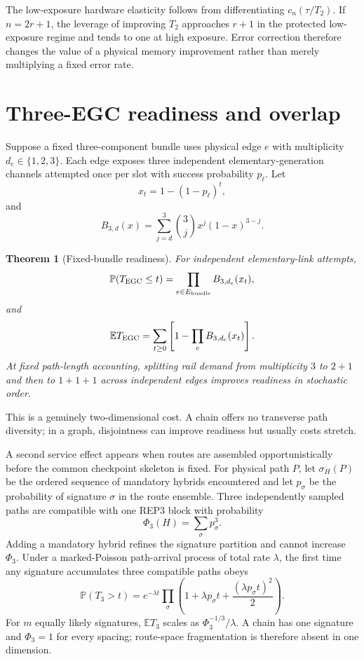 \documentclass[aps,prx,reprint,superscriptaddress,nofootinbib,longbibliography,floatfix]{revtex4-2}
\newtheorem{theorem}{Theorem}\newtheorem{proposition}[theorem]{Proposition}\newtheorem{corollary}[theorem]{Corollary}
\newcommand{\E}{\mathbb E}\newcommand{\Prob}{\mathbb P}
\begin{document}
The low-exposure hardware elasticity follows from differentiating $c_n(\tau/T_2)$. If $n=2r+1$, the leverage of improving $T_2$ approaches $r+1$ in the protected low-exposure regime and tends to one at high exposure. Error correction therefore changes the value of a physical memory improvement rather than merely multiplying a fixed error rate.

\section{Three-EGC readiness and overlap}
Suppose a fixed three-component bundle uses physical edge $e$ with multiplicity $d_e\in\{1,2,3\}$. Each edge exposes three independent elementary-generation channels attempted once per slot with success probability $p_\ell$. Let
\begin{equation}
x_t=1-(1-p_\ell)^t,
\end{equation}
and
\begin{equation}
B_{3,d}(x)=\sum_{j=d}^{3}{3\choose j}x^j(1-x)^{3-j}.
\end{equation}

\begin{theorem}[Fixed-bundle readiness]
For independent elementary-link attempts,
\begin{equation}
\Prob(T_{\rm EGC}\le t)=\prod_{e\in E_{\rm bundle}}B_{3,d_e}(x_t),
\end{equation}
and
\begin{equation}
\E T_{\rm EGC}=\sum_{t\ge0}\left[1-\prod_e B_{3,d_e}(x_t)\right].
\end{equation}
At fixed path-length accounting, splitting rail demand from multiplicity $3$ to $2+1$ and then to $1+1+1$ across independent edges improves readiness in stochastic order.
\end{theorem}

This is a genuinely two-dimensional cost. A chain offers no transverse path diversity; in a graph, disjointness can improve readiness but usually costs stretch.

A second service effect appears when routes are assembled opportunistically before the common checkpoint skeleton is fixed. For physical path $P$, let $\sigma_H(P)$ be the ordered sequence of mandatory hybrids encountered and let $p_\sigma$ be the probability of signature $\sigma$ in the route ensemble. Three independently sampled paths are compatible with one REP3 block with probability
\begin{equation}
\Phi_3(H)=\sum_\sigma p_\sigma^3.
\end{equation}
Adding a mandatory hybrid refines the signature partition and cannot increase $\Phi_3$. Under a marked-Poisson path-arrival process of total rate $\lambda$, the first time any signature accumulates three compatible paths obeys
\begin{equation}
\Prob(T_3>t)=e^{-\lambda t}\prod_\sigma\left(1+\lambda p_\sigma t+\frac{(\lambda p_\sigma t)^2}{2}\right).
\end{equation}
For $m$ equally likely signatures, $\E T_3$ scales as $\Phi_3^{-1/3}/\lambda$. A chain has one signature and $\Phi_3=1$ for every spacing; route-space fragmentation is therefore absent in one dimension.
\end{document}
